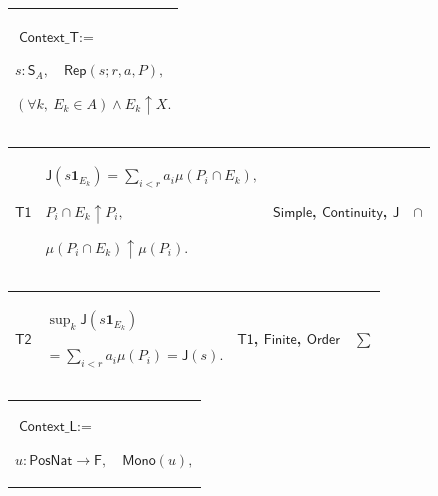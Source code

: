 \documentclass[11pt]{amsart}
\newlength{\FTCOneColumnBody}
\newlength{\FTCFourColumnBody}
\begin{document}
{\begin{tabular}{|@{}>{\centering\arraybackslash}m{\FTCOneColumnBody}|}
$\displaystyle \textsf{Context\_T}:=$\par
$\displaystyle s:\textsf{S}_A,\quad\textsf{Rep}(s;r,a,P),$\par
$\displaystyle (\forall k,\ E_k\in A)\land E_k\uparrow X.$\\ \hline
\end{tabular}%
\par\setlength{\parskip}{0pt}\nointerlineskip
\noindent
\begin{tabular}{|@{}>{\centering\arraybackslash}m{0.078431\FTCFourColumnBody}|>{\centering\arraybackslash}m{0.535947\FTCFourColumnBody}|>{\centering\arraybackslash}m{0.281045\FTCFourColumnBody}|>{\centering\arraybackslash}m{0.104575\FTCFourColumnBody}|}\hline
\hypertarget{proof:T1}{$\displaystyle \textsf{T1}$} & $\displaystyle \textsf{J}(s\mathbf1_{E_k})=\sum_{i<r}a_i\mu(P_i\cap E_k),$\par
$\displaystyle P_i\cap E_k\uparrow P_i,$\par
$\displaystyle \mu(P_i\cap E_k)\uparrow\mu(P_i).$ & \hyperlink{lem:Simple}{$\displaystyle \textsf{Simple}$}, \hyperlink{lem:Continuity}{$\displaystyle \textsf{Continuity}$}, \hyperlink{def:J}{$\displaystyle \textsf{J}$} & $\displaystyle \cap$\\ \hline
\end{tabular}%
\par\setlength{\parskip}{0pt}\nointerlineskip
\noindent
\begin{tabular}{|@{}>{\centering\arraybackslash}m{0.078431\FTCFourColumnBody}|>{\centering\arraybackslash}m{0.535947\FTCFourColumnBody}|>{\centering\arraybackslash}m{0.281045\FTCFourColumnBody}|>{\centering\arraybackslash}m{0.104575\FTCFourColumnBody}|}\hline
\hypertarget{proof:T2}{$\displaystyle \textsf{T2}$} & $\displaystyle \sup_k\textsf{J}(s\mathbf1_{E_k})$\par
$\displaystyle {}=\sum_{i<r}a_i\mu(P_i)=\textsf{J}(s).$ & \hyperlink{proof:T1}{$\displaystyle \textsf{T1}$}, \hyperlink{lem:Finite}{$\displaystyle \textsf{Finite}$}, \hyperlink{ax:Order}{$\displaystyle \textsf{Order}$} & $\displaystyle \sum$\\ \hline
\end{tabular}%
\par\setlength{\parskip}{0pt}\nointerlineskip
\noindent
\begin{tabular}{|@{}>{\centering\arraybackslash}m{\FTCOneColumnBody}|}\hline
$\displaystyle \textsf{Context\_L}:=$\par
$\displaystyle u:\textsf{PosNat}\to\textsf{F},\quad\textsf{Mono}(u),$\par

\end{tabular}}
\end{document}
